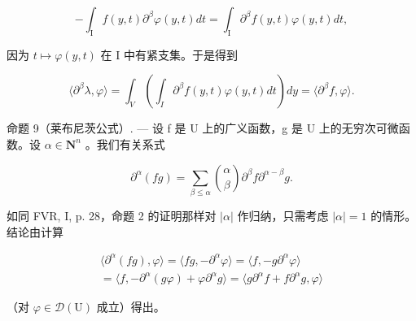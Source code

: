 \[
- \int_ {\mathrm{I}} f (y, t) \partial^ {\beta} \varphi (y, t) d t = \int_ {\mathrm{I}} \partial^ {\beta} f (y, t) \varphi (y, t) d t,
\]

因为 \(t \mapsto \varphi(y, t)\) 在 I 中有紧支集。于是得到

\[
\langle \partial^ {\beta} \lambda , \varphi \rangle = \int_ {V} \left(\int_ {I} \partial^ {\beta} f (y, t) \varphi (y, t) d t\right) d y = \langle \partial^ {\beta} f, \varphi \rangle .
\]

命题 9（莱布尼茨公式）. --- 设 f 是 U 上的广义函数，g 是 U 上的无穷次可微函数。设 \(\alpha \in \mathbf{N}^n\) 。我们有关系式

\[
\partial^ {\alpha} (f g) = \sum_ {\beta \leqslant \alpha} \binom {\alpha} {\beta} \partial^ {\beta} f   \partial^ {\alpha - \beta} g.
\]

如同 FVR, I, p. 28，命题 2 的证明那样对 \(|\alpha|\) 作归纳，只需考虑 \(|\alpha|=1\) 的情形。结论由计算

\[
\begin{array}{c} \langle \partial^ {\alpha} (f g), \varphi \rangle = \langle f g, - \partial^ {\alpha} \varphi \rangle = \langle f, - g \partial^ {\alpha} \varphi \rangle \\ = \langle f, - \partial^ {\alpha} (g \varphi) + \varphi \partial^ {\alpha} g \rangle = \langle g \partial^ {\alpha} f + f \partial^ {\alpha} g, \varphi \rangle \end{array}
\]

（对 \(\varphi\in\mathcal{D}(\mathrm{U})\) 成立）得出。


